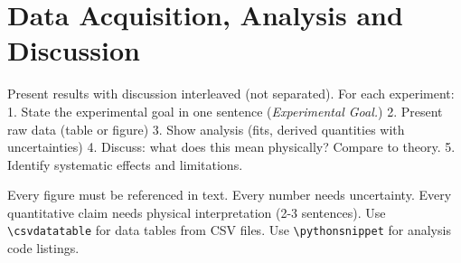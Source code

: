 \documentclass[aps,prl,twocolumn,10pt,superscriptaddress]{revtex4-2}
\begin{document}
\section{Data Acquisition, Analysis and Discussion}

\begin{guidance}
Present results with discussion interleaved (not separated).
For each experiment:
  1. State the experimental goal in one sentence (\emph{Experimental Goal.})
  2. Present raw data (table or figure)
  3. Show analysis (fits, derived quantities with uncertainties)
  4. Discuss: what does this mean physically? Compare to theory.
  5. Identify systematic effects and limitations.

Every figure must be referenced in text. Every number needs uncertainty.
Every quantitative claim needs physical interpretation (2-3 sentences).
Use \verb|\csvdatatable| for data tables from CSV files.
Use \verb|\pythonsnippet| for analysis code listings.
\end{guidance}


\end{document}
